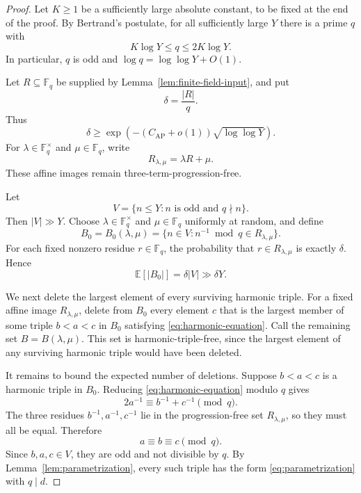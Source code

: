 \documentclass[10pt,a4paper]{amsart}
\newcommand{\AP}{\mathrm{AP}}
\newcommand{\F}{\mathbb F}
\begin{document}
\begin{proof}
Let $K\ge 1$ be a sufficiently large absolute constant, to be fixed at the end of the proof.  By Bertrand's postulate, for all sufficiently large $Y$ there is a prime $q$ with
\begin{equation}\label{eq:q-choice}
  K\log Y\le q\le 2K\log Y .
\end{equation}
In particular, $q$ is odd and $\log q=\log\log Y+O(1)$.

Let $R\subseteq\F_q$ be supplied by Lemma~\ref{lem:finite-field-input}, and put
\[
  \delta=\frac{|R|}{q}.
\]
Thus
\begin{equation}\label{eq:delta-bound}
  \delta\ge \exp\!\left(-(C_{\AP}+o(1))\sqrt{\log\log Y}\right).
\end{equation}
For $\lambda\in\F_q^\times$ and $\mu\in\F_q$, write
\[
  R_{\lambda,\mu}=\lambda R+\mu .
\]
These affine images remain three-term-progression-free.

Let
\[
  V=\{n\le Y:n\text{ is odd and }q\nmid n\}.
\]
Then $|V|\gg Y$.  Choose $\lambda\in\F_q^\times$ and $\mu\in\F_q$ uniformly at random, and define
\[
  B_0=B_0(\lambda,\mu)=\{n\in V:n^{-1}\bmod q\in R_{\lambda,\mu}\}.
\]
For each fixed nonzero residue $r\in\F_q$, the probability that $r\in R_{\lambda,\mu}$ is exactly $\delta$.  Hence
\begin{equation}\label{eq:initial-expected-size}
  \mathbb E\!\left[|B_0|\right]=\delta |V|\gg \delta Y .
\end{equation}

We next delete the largest element of every surviving harmonic triple. For a fixed affine image $R_{\lambda,\mu}$, delete from $B_0$ every element $c$ that is the largest member of some triple $b<a<c$ in $B_0$ satisfying \eqref{eq:harmonic-equation}.  Call the remaining set $B=B(\lambda,\mu)$.  This set is harmonic-triple-free, since the largest element of any surviving harmonic triple would have been deleted.

It remains to bound the expected number of deletions.  Suppose $b<a<c$ is a harmonic triple in $B_0$.  Reducing \eqref{eq:harmonic-equation} modulo $q$ gives
\[
  2a^{-1}\equiv b^{-1}+c^{-1}\pmod q.
\]
The three residues $b^{-1},a^{-1},c^{-1}$ lie in the progression-free set $R_{\lambda,\mu}$, so they must all be equal.  Therefore
\begin{equation}\label{eq:abc-congruent}
  a\equiv b\equiv c\pmod q .
\end{equation}
Since $b,a,c\in V$, they are odd and not divisible by $q$.  By Lemma~\ref{lem:parametrization}, every such triple has the form \eqref{eq:parametrization} with $q\mid d$.


\end{proof}
\end{document}
